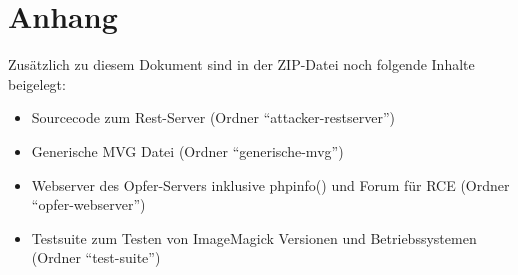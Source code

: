\chapter{Anhang}\label{ch:anhang}

Zusätzlich zu diesem Dokument sind in der ZIP-Datei noch folgende Inhalte beigelegt:

\begin{itemize}[\itemsep=1em]
    \item Sourcecode zum Rest-Server (Ordner "`attacker-restserver"')
    \item Generische MVG Datei (Ordner "`generische-mvg"')
    \item Webserver des Opfer-Servers inklusive phpinfo() und Forum für RCE (Ordner "`opfer-webserver"')
    \item Testsuite zum Testen von ImageMagick Versionen und Betriebssystemen (Ordner "`test-suite"')
\end{itemize}